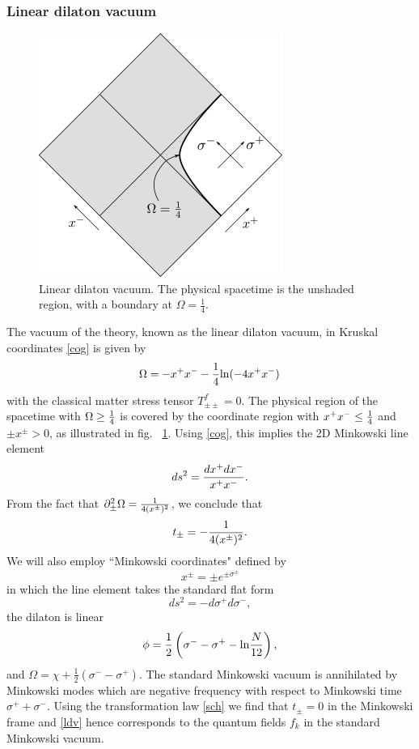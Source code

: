 \documentclass[11pt,oneside,letterpaper]{article}
\newcommand{\p}{\partial}
\newcommand{\f}{\frac}
\newcommand{\be}{\begin{equation}}
\newcommand{\ee}{\end{equation}}
\def\be{\begin{eqnarray}}
\def\ee{\end{eqnarray}}
\let\s=\sigma \let\t=\tau \let\u=\upsilon \let\c=\chi
\let\f=\frac
\def\be{\begin{equation}}
\def\ee{\end{equation}}
\def\log{{\rm ln}}
\renewcommand{\p}{\partial}
\numberwithin{equation}{section}
\def \be {\begin{equation}}
\def \ee {\end{equation}}
\begin{document}
\subsubsection{Linear dilaton vacuum}
\begin{figure}
\begin{center}
\includegraphics[scale=1.0]{figures/vacuum.png}
\end{center}
\caption{\small Linear dilaton vacuum. The physical spacetime is the unshaded region, with a boundary at $\Omega = \frac{1}{4}$.\label{fig:vacuum}}
\end{figure}

The vacuum of the theory, known as the linear dilaton vacuum, in  Kruskal coordinates \eqref{cog} is 
given by 
\be\label{ldv}
\Omega = -  x^+ x^- - \f 1 4 \log(-4  x^+ x^-)\,
\ee
with the classical matter stress tensor $T^f_{\pm\pm}=0$. 
The physical region of the spacetime with $\Omega\ge{1 \over 4}$ is covered by the coordinate region with $x^+x^-\le {1 \over 4}$
and $\pm x^\pm>0$, as illustrated in fig. ~\ref{fig:vacuum}. Using \eqref{cog}, this implies the 2D Minkowski line element 
\be ds^2={dx^+dx^-\over x^+x^-}.\ee  From the fact that $\p_\pm^2\Omega={1 \over 4(x^\pm)^2}$, we conclude that \be t_\pm=-{1 \over 4(x^\pm)^2}.\ee
We will also employ
 ``Minkowski coordinates"  defined by \be x^\pm = \pm e^{\pm \s^\pm}\ee 
 in which the line element takes the standard flat form
 \be
ds^2 = -d\s^+ d\s^-,
\ee 
the dilaton is linear 
\be \phi=\f 1 2 \left(\s^--\s^+-\log \f{N}{12}\right),\ee
and $\Omega=\chi+\f 1 2(\s^--\s^+)$.
The standard Minkowski vacuum is annihilated by Minkowski modes which are negative frequency with respect to Minkowski time $\s^++\s^-$. Using the transformation law \eqref{sch} we find that $t_\pm=0$ in the Minkowski frame and \eqref{ldv} hence corresponds to the quantum fields $f_k$ in the standard Minkowski vacuum. 
\end{document}
